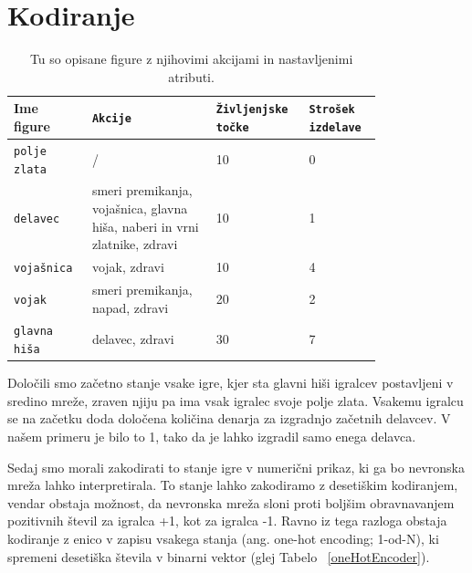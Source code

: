 \documentclass[a4paper, 12pt]{book}
\begin{document}
{\section{Kodiranje}
\label{kodiranja}
\begin{table}
	\begin{center}
	\begin{tabular}{p{0.15\linewidth}|p{0.3\linewidth}|p{0.18\linewidth}|p{0.17\linewidth}}
		Ime figure          & {\tt Akcije}                                                              & {\tt Življenjske točke} & {\tt Strošek izdelave} \\ \hline
		{\tt polje zlata}   & /                                                                         & 10            & 0 \\
		{\tt delavec}       & smeri premikanja, vojašnica, glavna hiša, naberi in vrni zlatnike, zdravi & 10            & 1 \\
		{\tt vojašnica}     & vojak, zdravi                                                             & 10            & 4 \\
		{\tt vojak}         & smeri premikanja, napad, zdravi                                           & 20            & 2 \\
		{\tt glavna hiša}   & delavec, zdravi                                                           & 30            & 7 \\
	\end{tabular}
	\end{center}
	\caption{Tu so opisane figure z njihovimi akcijami in nastavljenimi atributi.}
	\label{tabelfigures}
\end{table}

Določili smo začetno stanje vsake igre, kjer sta glavni hiši igralcev postavljeni v sredino mreže, zraven njiju pa ima vsak igralec svoje polje zlata. 
Vsakemu igralcu se na začetku doda določena količina denarja za izgradnjo začetnih delavcev. 
V našem primeru je bilo to 1, tako da je lahko izgradil samo enega delavca.

Sedaj smo morali zakodirati to stanje igre v numerični prikaz, ki ga bo nevronska mreža lahko interpretirala. 
To stanje lahko zakodiramo z desetiškim kodiranjem, vendar obstaja možnost, da nevronska mreža sloni proti boljšim obravnavanjem pozitivnih števil za igralca +1, kot za igralca -1. 
Ravno iz tega razloga obstaja kodiranje z enico v zapisu vsakega stanja (ang. one-hot encoding; 1-od-N), ki spremeni desetiška števila v binarni vektor (glej Tabelo ~\ref{oneHotEncoder}).

}
\end{document}

